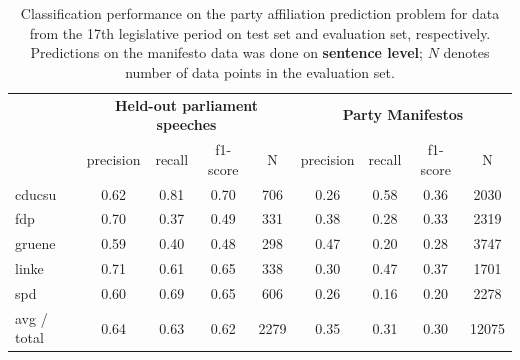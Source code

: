 \documentclass[runningheads,a4paper]{llncs}
\begin{document}
\begin{table}[t]
\caption{
\label{tab:results_17}
Classification performance on the party affiliation prediction problem for data from the 17th legislative period on test set and evaluation set, respectively. Predictions on the manifesto data was done on {\bf sentence level}; $N$ denotes number of data points in the evaluation set.
}
\begin{center}
\begin{tabular}{lcccccccc}
& \multicolumn{4}{c}{\bf Held-out parliament speeches} & \multicolumn{4}{c}{\bf Party Manifestos}\\
    &         precision    &recall &  f1-score  & N    &         precision    &recall &  f1-score  & N\\
\hline \hline
       cducsu   &    0.62  &    0.81  &    0.70  &     706&0.26    &  0.58   &   0.36    &  2030\\
        fdp    &   0.70   &   0.37  &    0.49    &   331&0.38   &   0.28    &  0.33   &   2319\\
     gruene &      0.59  &    0.40   &   0.48   &    298&0.47  &    0.20   &   0.28 &     3747\\
      linke    &   0.71   &   0.61  &    0.65    &   338&0.30   &   0.47   &   0.37    &  1701\\
        spd   &    0.60   &   0.69  &    0.65   &    606&0.26   &   0.16   &   0.20  &    2278\\
\hline
avg / total &      0.64   &   0.63   &   0.62    &  2279 &0.35    &  0.31 &     0.30   &  12075
%
\end{tabular}
\end{center}
\end{table}
\end{document}
